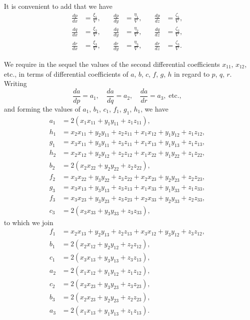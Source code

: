 \documentclass[11pt,a4paper]{book}
\begin{document}
It is convenient to add that we have
\[
\begin{aligned}
\frac{dp}{dx} &= \frac{\xi_1}{\nabla}, \quad &\frac{dp}{dy} &= \frac{\eta_1}{\nabla}, \quad &\frac{dp}{dz} &= \frac{\zeta_1}{\nabla}, \\
\frac{dq}{dx} &= \frac{\xi_2}{\nabla}, \quad &\frac{dq}{dy} &= \frac{\eta_2}{\nabla}, \quad &\frac{dq}{dz} &= \frac{\zeta_2}{\nabla}, \\
\frac{dr}{dx} &= \frac{\xi_3}{\nabla}, \quad &\frac{dr}{dy} &= \frac{\eta_3}{\nabla}, \quad &\frac{dr}{dz} &= \frac{\zeta_3}{\nabla}.
\end{aligned}
\]

We require in the sequel the values of the second differential coefficients $x_{11}$, $x_{12}$, etc., in terms of differential coefficients of $a$, $b$, $c$, $f$, $g$, $h$ in regard to $p$, $q$, $r$. Writing
\[
\frac{da}{dp} = a_1, \quad \frac{da}{dq} = a_2, \quad \frac{da}{dr} = a_3, \; \text{etc.},
\]
and forming the values of $a_1$, $b_1$, $c_1$, $f_1$, $g_1$, $h_1$, we have
\[
\begin{aligned}
a_1 &= 2(x_1 x_{11} + y_1 y_{11} + z_1 z_{11}), \\
h_1 &= x_2 x_{11} + y_2 y_{11} + z_2 z_{11} + x_1 x_{12} + y_1 y_{12} + z_1 z_{12}, \\
g_1 &= x_3 x_{11} + y_3 y_{11} + z_3 z_{11} + x_1 x_{13} + y_1 y_{13} + z_1 z_{13}, \\
h_2 &= x_2 x_{12} + y_2 y_{12} + z_2 z_{12} + x_1 x_{22} + y_1 y_{22} + z_1 z_{22}, \\
b_2 &= 2(x_2 x_{22} + y_2 y_{22} + z_2 z_{22}), \\
f_2 &= x_3 x_{22} + y_3 y_{22} + z_3 z_{22} + x_2 x_{23} + y_2 y_{23} + z_2 z_{23}, \\
g_3 &= x_3 x_{13} + y_3 y_{13} + z_3 z_{13} + x_1 x_{33} + y_1 y_{33} + z_1 z_{33}, \\
f_3 &= x_3 x_{23} + y_3 y_{23} + z_3 z_{23} + x_2 x_{33} + y_2 y_{33} + z_2 z_{33}, \\
c_3 &= 2(x_3 x_{33} + y_3 y_{33} + z_3 z_{33}),
\end{aligned}
\]
to which we join
\[
\begin{aligned}
f_1 &= x_2 x_{13} + y_2 y_{13} + z_2 z_{13} + x_3 x_{12} + y_3 y_{12} + z_3 z_{12}, \\
b_1 &= 2(x_2 x_{12} + y_2 y_{12} + z_2 z_{12}), \\
c_1 &= 2(x_3 x_{13} + y_3 y_{13} + z_3 z_{13}), \\
a_2 &= 2(x_1 x_{12} + y_1 y_{12} + z_1 z_{12}), \\
c_2 &= 2(x_3 x_{23} + y_3 y_{23} + z_3 z_{23}), \\
b_3 &= 2(x_2 x_{23} + y_2 y_{23} + z_2 z_{23}), \\
a_3 &= 2(x_1 x_{13} + y_1 y_{13} + z_1 z_{13}).
\end{aligned}
\]
\end{document}
